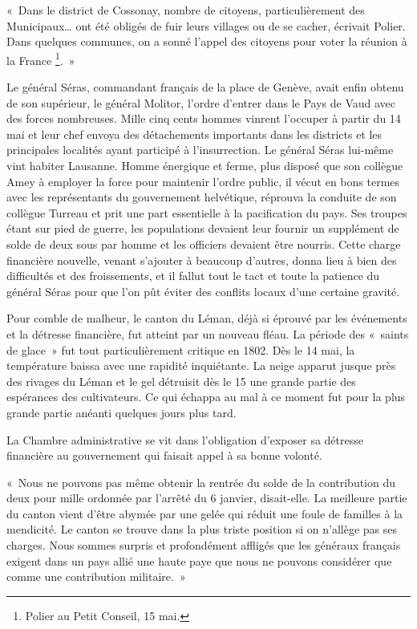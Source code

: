 \documentclass[french,twoside]{book} %
\newenvironment{quoteblock}%
  {\begin{quoting}}
  {\end{quoting}}
\newenvironment{quotebar}{%
    \def\FrameCommand{{\color{rubric!10!}\vrule width 0.5em} \hspace{0.9em}}%
    \def\OuterFrameSep{\itemsep} %
    \MakeFramed {\advance\hsize-\width \FrameRestore}
  }%
  {%
    \endMakeFramed
  }
\renewenvironment{quoteblock}%
  {%
    \savenotes
    \setstretch{0.9}
    \normalfont
    \begin{quotebar}
  }
  {%
    \end{quotebar}
    \spewnotes
  }
\begin{document}
\begin{quoteblock}
 \noindent « Dans le district de Cossonay, nombre de citoyens, particulièrement des Municipaux… ont été obligés de fuir leurs villages ou de se cacher, écrivait Polier. Dans quelques communes, on a sonné l’appel des citoyens pour voter la réunion à la France \footnote{Polier au Petit Conseil, 15 mai.}. »
 \end{quoteblock}

\noindent Le général Séras, commandant français de la place de Genève, avait enfin obtenu de son supérieur, le général Molitor, l’ordre d’entrer dans le Pays de Vaud avec des forces nombreuses. Mille cinq cents hommes vinrent l’occuper à partir du 14 mai et leur chef envoya des détachements importants dans les districts et les principales localités ayant participé à l’insurrection. Le général Séras lui-même vint habiter Lausanne. Homme énergique et ferme, plus disposé que son collègue Amey à employer la force pour maintenir l’ordre public, il vécut en bons termes avec les représentants du gouvernement helvétique, réprouva la conduite de son collègue Turreau et prit une part essentielle à la pacification du pays. Ses troupes étant sur pied de guerre, les populations devaient leur fournir un supplément de solde de deux sous par homme et les officiers devaient être nourris. Cette charge financière nouvelle, venant s’ajouter à beaucoup d’autres, donna lieu à bien des difficultés et des froissements, et il fallut tout le tact et toute la patience du général Séras pour que l’on pût éviter des conflits locaux d’une certaine gravité.\par
Pour comble de malheur, le canton du Léman, déjà si éprouvé par les événements et la détresse financière, fut atteint par un nouveau fléau. La période des « saints de glace » fut tout particulièrement critique en 1802. Dès le 14 mai, la température baissa avec une rapidité inquiétante. La neige apparut jusque près des rivages du Léman et le gel détruisit dès le 15 une grande partie des espérances des cultivateurs. Ce qui échappa au mal à ce moment fut pour la plus grande partie anéanti quelques jours plus tard.\par
La Chambre administrative se vit dans l’obligation d’exposer sa détresse financière au gouvernement qui faisait appel à sa bonne volonté.\par

\begin{quoteblock}
 \noindent « Nous ne pouvons pas même obtenir la rentrée du solde de la contribution du deux pour mille ordonnée par l’arrêté du 6 janvier, disait-elle. La meilleure partie du canton vient d’être abymée par une gelée qui réduit une foule de familles à la mendicité. Le canton se trouve dans la plus triste position si on n’allège pas ses charges. Nous sommes surpris et profondément affligés que les généraux français exigent dans un pays allié une haute paye que nous ne pouvons considérer que comme une contribution militaire. »
 \end{quoteblock}
\end{document}
